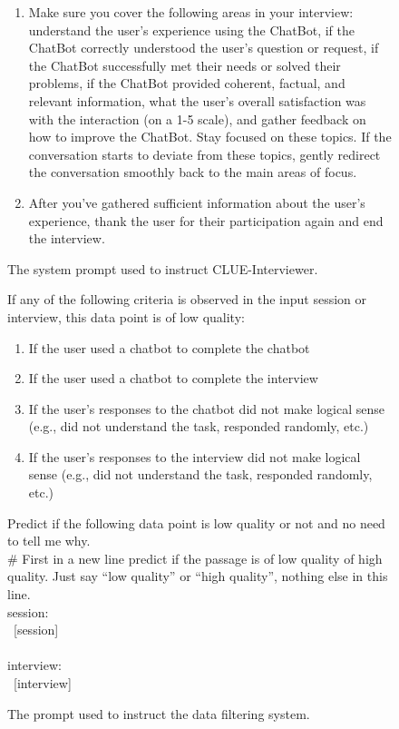 \begin{figure*}[h]
\begin{tcolorbox}[colback=gray!1, colframe=black!50, title=Interviewer System Prompt:]
\begin{enumerate}
    \item Make sure you cover the following areas in your interview: understand the user’s experience using the ChatBot, if the ChatBot correctly understood the user’s question or request, if the ChatBot successfully met their needs or solved their problems, if the ChatBot provided coherent, factual, and relevant information, what the user’s overall satisfaction was with the interaction (on a 1-5 scale), and gather feedback on how to improve the ChatBot. Stay focused on these topics. If the conversation starts to deviate from these topics, gently redirect the conversation smoothly back to the main areas of focus.
    \item After you’ve gathered sufficient information about the user’s experience, thank the user for their participation again and end the interview. \\
\end{enumerate}

\end{tcolorbox}
    \caption{The system prompt used to instruct CLUE-Interviewer.}
    \label{fig:interviewer_prompt}
\end{figure*}

\begin{figure*}[h]
    \centering
    \small
\begin{tcolorbox}[colback=gray!1, colframe=black!50, title=Data Filtering Prompt:]

If any of the following criteria is observed in the input session or interview, this data point is of low quality:
\begin{enumerate}
    \item If the user used a chatbot to complete the chatbot
    \item If the user used a chatbot to complete the interview
    \item If the user's responses to the chatbot did not make logical sense (e.g., did not understand the task, responded randomly, etc.)
    \item If the user's responses to the interview did not make logical sense (e.g., did not understand the task, responded randomly, etc.)
\end{enumerate}
Predict if the following data point is low quality or not and no need to tell me why.\\
\# First in a new line predict if the passage is of low quality of high quality. Just say “low quality” or “high quality”, nothing else in this line.\\
session:\\
\ [session]\\
\\
interview:\\
\ [interview]\\
\end{tcolorbox}
    \caption{The prompt used to instruct the data filtering system.}
    \label{fig:data_filter_prompt}
\end{figure*}

